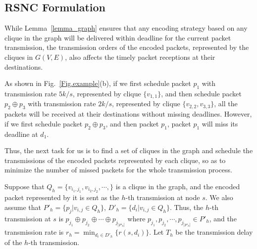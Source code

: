 \documentclass[journal]{IEEEtran}
\begin{document}
\vspace{-0.1in}
\subsection{RSNC Formulation}
While Lemma~\ref{lemma_graph} ensures that any encoding strategy based on any clique in the graph will be delivered within deadline for the current packet transmission, the transmission orders of the encoded packets, represented by the cliques in $G(V,E)$, also affects the timely packet receptions at their destinations.

As shown in Fig.~\ref{Fig.example}(b), if we first schedule packet $p_1$ with transmission rate $5k/s$, represented by clique $\{v_{1,1}\}$, and then schedule packet $p_2\oplus p_3$ with transmission rate $2k/s$, represented by clique $\{v_{2,2},v_{3,3}\}$, all the packets will be received at their destinations without missing deadlines. However, if we first schedule packet $p_2\oplus p_3$, and then packet $p_1$, packet $p_1$ will miss its deadline at $d_1$.

Thus, the next task for us is to find a set of cliques in the graph and schedule the transmissions of the encoded packets represented by each clique, so as to minimize the number of missed packets for the whole transmission process.

Suppose that $Q_h=\{v_{i_1,j_1},v_{i_2,j_2},\cdots,\}$ is a clique in the graph, and the encoded packet represented by it is sent as the $h$-th transmission at node $s$. We also assume that $P'_h=\{p_j|v_{i,j}\in Q_h\}$, $D'_h=\{d_i|v_{i,j}\in Q_h\}$. Thus, the $h$-th transmission at $s$ is $p_{j_1}\oplus p_{j_2}\oplus\cdots \oplus p_{j_{|P'_h|}}$ where $p_{j_1},p_{j_2},\cdots,p_{j_{|P'_h|}}\in P'_h$, and the transmission rate is $r_h=\min_{d_i\in D'_h}\{r(s,d_i)\}$. Let $T_h$ be the transmission delay of the $h$-th transmission.
\end{document}
